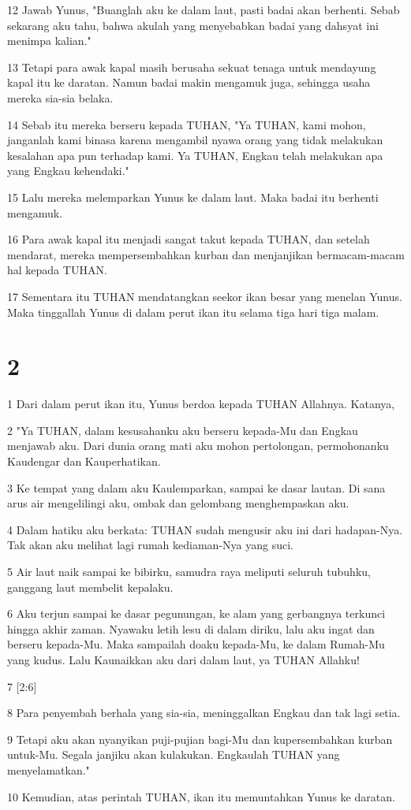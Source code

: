 \par 12 Jawab Yunus, "Buanglah aku ke dalam laut, pasti badai akan berhenti. Sebab sekarang aku tahu, bahwa akulah yang menyebabkan badai yang dahsyat ini menimpa kalian."
\par 13 Tetapi para awak kapal masih berusaha sekuat tenaga untuk mendayung kapal itu ke daratan. Namun badai makin mengamuk juga, sehingga usaha mereka sia-sia belaka.
\par 14 Sebab itu mereka berseru kepada TUHAN, "Ya TUHAN, kami mohon, janganlah kami binasa karena mengambil nyawa orang yang tidak melakukan kesalahan apa pun terhadap kami. Ya TUHAN, Engkau telah melakukan apa yang Engkau kehendaki."
\par 15 Lalu mereka melemparkan Yunus ke dalam laut. Maka badai itu berhenti mengamuk.
\par 16 Para awak kapal itu menjadi sangat takut kepada TUHAN, dan setelah mendarat, mereka mempersembahkan kurban dan menjanjikan bermacam-macam hal kepada TUHAN.
\par 17 Sementara itu TUHAN mendatangkan seekor ikan besar yang menelan Yunus. Maka tinggallah Yunus di dalam perut ikan itu selama tiga hari tiga malam.

\chapter{2}

\par 1 Dari dalam perut ikan itu, Yunus berdoa kepada TUHAN Allahnya. Katanya,
\par 2 "Ya TUHAN, dalam kesusahanku aku berseru kepada-Mu dan Engkau menjawab aku. Dari dunia orang mati aku mohon pertolongan, permohonanku Kaudengar dan Kauperhatikan.
\par 3 Ke tempat yang dalam aku Kaulemparkan, sampai ke dasar lautan. Di sana arus air mengelilingi aku, ombak dan gelombang menghempaskan aku.
\par 4 Dalam hatiku aku berkata: TUHAN sudah mengusir aku ini dari hadapan-Nya. Tak akan aku melihat lagi rumah kediaman-Nya yang suci.
\par 5 Air laut naik sampai ke bibirku, samudra raya meliputi seluruh tubuhku, ganggang laut membelit kepalaku.
\par 6 Aku terjun sampai ke dasar pegunungan, ke alam yang gerbangnya terkunci hingga akhir zaman. Nyawaku letih lesu di dalam diriku, lalu aku ingat dan berseru kepada-Mu. Maka sampailah doaku kepada-Mu, ke dalam Rumah-Mu yang kudus. Lalu Kaunaikkan aku dari dalam laut, ya TUHAN Allahku!
\par 7 [2:6]
\par 8 Para penyembah berhala yang sia-sia, meninggalkan Engkau dan tak lagi setia.
\par 9 Tetapi aku akan nyanyikan puji-pujian bagi-Mu dan kupersembahkan kurban untuk-Mu. Segala janjiku akan kulakukan. Engkaulah TUHAN yang menyelamatkan."
\par 10 Kemudian, atas perintah TUHAN, ikan itu memuntahkan Yunus ke daratan.

